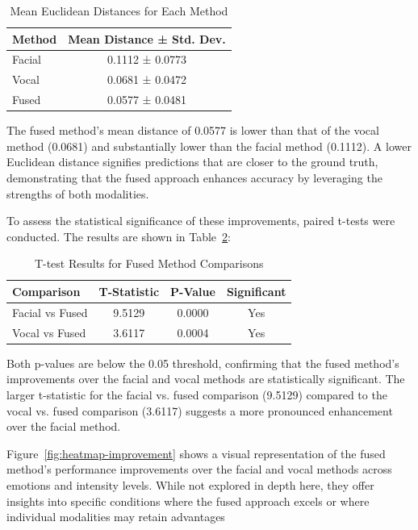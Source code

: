\begin{table}[H]
  \centering
    \caption{Mean Euclidean Distances for Each Method}
    \label{tab:mean-distances}
    \begin{tabular}{l|c}
        \textbf{Method} & \textbf{Mean Distance ± Std. Dev.} \\
        \hline
        Facial & 0.1112 ± 0.0773 \\
        Vocal  & 0.0681 ± 0.0472 \\
        Fused  & 0.0577 ± 0.0481 \\
    \end{tabular}
\end{table}

The fused method’s mean distance of 0.0577 is lower than that of the vocal method (0.0681) and substantially lower than the facial method (0.1112). A lower Euclidean distance signifies predictions that are closer to the ground truth, demonstrating that the fused approach enhances accuracy by leveraging the strengths of both modalities.

To assess the statistical significance of these improvements, paired t-tests were conducted. The results are shown in Table~\ref{tab:t-test}:

\begin{table}[H]
  \centering
    \caption{T-test Results for Fused Method Comparisons}
    \label{tab:t-test}
    \begin{tabular}{l|c|c|c}
        \textbf{Comparison} & \textbf{T-Statistic} & \textbf{P-Value} & \textbf{Significant} \\
        \hline
        Facial vs Fused & 9.5129 & 0.0000 & Yes \\
        Vocal vs Fused  & 3.6117 & 0.0004 & Yes \\
    \end{tabular}
\end{table}

Both p-values are below the 0.05 threshold, confirming that the fused method’s improvements over the facial and vocal methods are statistically significant. The larger t-statistic for the facial vs. fused comparison (9.5129) compared to the vocal vs. fused comparison (3.6117) suggests a more pronounced enhancement over the facial method.


Figure~\ref{fig:heatmap-improvement} shows a visual representation of the fused method’s performance improvements over the facial and vocal methods across emotions and intensity levels. While not explored in depth here, they offer insights into specific conditions where the fused approach excels or where individual modalities may retain advantages


